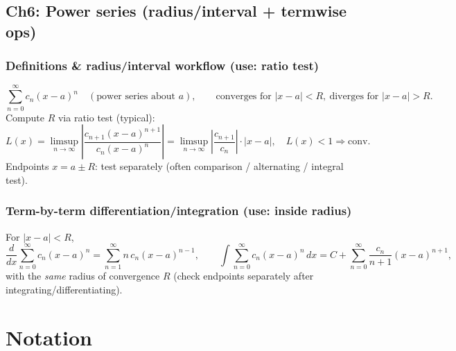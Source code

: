 \documentclass[12pt]{article}
\begin{document}
\subsection{Ch6: Power series (radius/interval + termwise ops)}
\subsubsection{Definitions \& radius/interval workflow (use: ratio test)}
\[
\sum_{n=0}^{\infty} c_n(x-a)^n\quad(\text{power series about }a),\qquad
\text{converges for }|x-a|<R,\ \text{diverges for }|x-a|>R.
\]
Compute $R$ via ratio test (typical):
\[
L(x)=\limsup_{n\to\infty}\left|\frac{c_{n+1}(x-a)^{n+1}}{c_n(x-a)^n}\right|
=\limsup_{n\to\infty}\left|\frac{c_{n+1}}{c_n}\right|\cdot |x-a|,\quad
L(x)<1\Rightarrow \text{conv}.
\]
Endpoints $x=a\pm R$: test separately (often comparison / alternating / integral test).

\subsubsection{Term-by-term differentiation/integration (use: inside radius)}
For $|x-a|<R$,
\[
\frac{d}{dx}\sum_{n=0}^{\infty} c_n(x-a)^n=\sum_{n=1}^{\infty} n\,c_n(x-a)^{n-1},\qquad
\int \sum_{n=0}^{\infty} c_n(x-a)^n\,dx=C+\sum_{n=0}^{\infty}\frac{c_n}{n+1}(x-a)^{n+1},
\]
with the \emph{same} radius of convergence $R$ (check endpoints separately after integrating/differentiating).

\newpage
\section{Notation}
\end{document}
